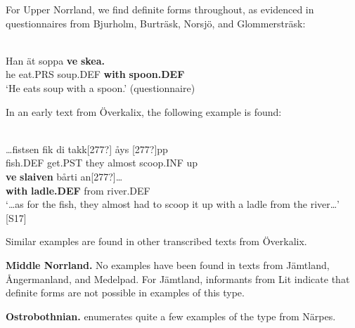 \z

For Upper Norrland, we find definite forms throughout, as evidenced in questionnaires from Bjurholm, Burträsk, Norsjö, and Glommersträsk:

\ea \label{} 
\\
\gll Han  ät  soppa  \textbf{ve} \textbf{skea.} \\
he  eat.PRS  soup.DEF  \textbf{with} \textbf{spoon.DEF} \\
\glt ‘He eats soup with a spoon.’ (questionnaire)

\z

In an early text from Överkalix, the following example is found:

\ea \label{} 
\\
\gll …fistsen  fik  di  takk[277?]  åys  [277?]pp\\
fish.DEF  get.PST  they  almost  scoop.INF  up\\
\gll \textbf{ve} \textbf{slaiven} bårti  an[277?]…\\
\textbf{with} \textbf{ladle.DEF} from  river.DEF\\
\glt ‘…as for the fish, they almost had to scoop it up with a ladle from the river…’ [S17]

\z

Similar examples are found in other transcribed texts from Överkalix. 

\textbf{Middle Norrland.} No examples have been found in texts from Jämtland, Ångermanland, and Medelpad. For Jämtland, informants from Lit indicate that definite forms are not possible in examples of this type.

\textbf{Ostrobothnian. }\citet{Hummelstedt1934} enumerates quite a few examples of the type from Närpes. 

	
\ea\label{}
\\
	\z 
\z

